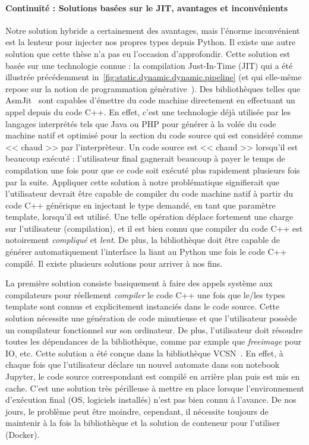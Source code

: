\paragraph{Continuité : Solutions basées sur le JIT, avantages et inconvénients}

Notre solution hybride a certainement des avantages, mais l'énorme inconvénient est la lenteur pour injecter nos propres
types depuis Python. Il existe une autre solution que cette thèse n'a pas eu l'occasion d'approfondir. Cette solution
est basée sur une technologie connue : la compilation Just-In-Time (JIT) qui a été illustrée précédemment
in~\cref{fig:static.dynamic.dynamic.pipeline} (et qui elle-même repose sur la notion de programmation
générative~\parencite{czarnecki.2000.generative}). Des bibliothèques telles que AsmJit~\parencite{kobalicek.2011.asmjit}
sont capables d'émettre du code machine directement en effectuant un appel depuis du code C++. En effet, c'est une
technologie déjà utilisée par les langages interprétés tels que Java ou PHP pour générer à la volée du code machine
natif et optimisé pour la section du code source qui est considéré comme << chaud >> par l'interprèteur. Un code source
est << chaud >> lorsqu'il est beaucoup exécuté : l'utilisateur final gagnerait beaucoup à payer le temps de compilation
une fois pour que ce code soit exécuté plus rapidement plusieurs fois par la suite. Appliquer cette solution à notre
problématique signifierait que l'utilisateur devrait être capable de compiler du code machine natif à partir du code C++
générique en injectant le type demandé, en tant que paramètre template, lorsqu'il est utilisé. Une telle opération
déplace fortement une charge sur l'utilisateur (compilation), et il est bien connu que compiler du code C++ est
notoirement \emph{compliqué} et \emph{lent}. De plus, la bibliothèque doit être capable de générer automatiquement
l'interface la liant au Python une fois le code C++ compilé. Il existe plusieurs solutions pour arriver à nos fins.

La première solution consiste basiquement à faire des appels système aux compilateurs pour réellement \emph{compiler} le
code C++ une fois que le/les types template sont connus et explicitement instanciés dans le code source. Cette solution
nécessite une génération de code minutieuse et que l'utilisateur possède un compilateur fonctionnel sur son ordinateur.
De plus, l'utilisateur doit résoudre toutes les dépendances de la bibliothèque, comme par exmple que \emph{freeimage}
pour IO, etc. Cette solution a été conçue dans la bibliothèque VCSN~\parencite{demaille.2013.vcsn}. En effet, à chaque
fois que l'utilisateur déclare un nouvel automate dans son notebook Jupyter, le code source correspondant est compilé en
arrière plan puis est mis en cache. C'est une solution très périlleuse à mettre en place lorsque l'environnement
d'exécution final (OS, logiciels installés) n'est pas bien connu à l'avance. De nos jours, le problème peut être
moindre, cependant, il nécessite toujours de maintenir à la fois la bibliothèque et la solution de conteneur pour
l'utiliser (Docker).

